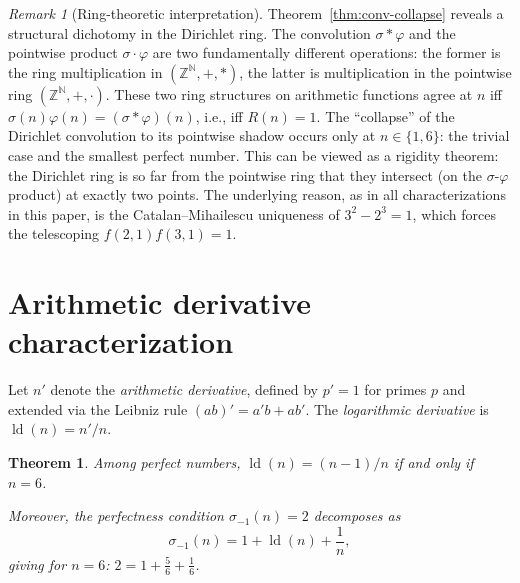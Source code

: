 \documentclass[11pt]{amsart}
\newtheorem{theorem}{Theorem}
\theoremstyle{remark}
\newtheorem*{remark}{Remark}
\begin{document}
\begin{remark}[Ring-theoretic interpretation]
Theorem~\ref{thm:conv-collapse} reveals a structural dichotomy
in the Dirichlet ring. The convolution $\sigma * \varphi$ and the
pointwise product $\sigma \cdot \varphi$ are two fundamentally
different operations: the former is the ring multiplication in
$(\mathbb{Z}^{\mathbb{N}}, +, *)$, the latter is multiplication in
the pointwise ring $(\mathbb{Z}^{\mathbb{N}}, +, \cdot)$.
These two ring structures on arithmetic functions agree at $n$ iff
$\sigma(n)\varphi(n) = (\sigma * \varphi)(n)$, i.e., iff $R(n) = 1$.
The ``collapse'' of the Dirichlet convolution to its pointwise shadow
occurs only at $n \in \{1, 6\}$: the trivial case and the smallest
perfect number.
This can be viewed as a rigidity theorem: the Dirichlet ring
is so far from the pointwise ring that they intersect
(on the $\sigma$-$\varphi$ product) at exactly two points.
The underlying reason, as in all characterizations in this paper,
is the Catalan--Mihailescu uniqueness of $3^2 - 2^3 = 1$,
which forces the telescoping $f(2,1) f(3,1) = 1$.
\end{remark}

\section{Arithmetic derivative characterization}

Let $n'$ denote the \emph{arithmetic derivative}, defined by
$p' = 1$ for primes $p$ and extended via the Leibniz rule
$(ab)' = a'b + ab'$. The \emph{logarithmic derivative} is
$\operatorname{ld}(n) = n'/n$.

\begin{theorem}\label{thm:arith-deriv}
Among perfect numbers, $\operatorname{ld}(n) = (n-1)/n$
if and only if $n = 6$.

Moreover, the perfectness condition $\sigma_{-1}(n) = 2$
decomposes as
\[
  \sigma_{-1}(n) = 1 + \operatorname{ld}(n) + \frac{1}{n},
\]
giving for $n = 6$: $2 = 1 + \tfrac{5}{6} + \tfrac{1}{6}$.
\end{theorem}
\end{document}
